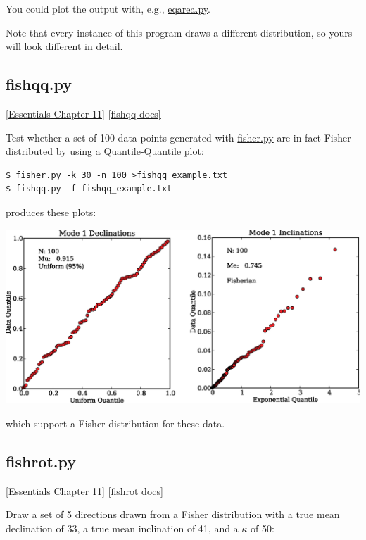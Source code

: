 \documentclass[11pt]{book}
\begin{document}
{{  You could plot the output with, e.g., \href{#eqarea.py}{eqarea.py}.

  Note that every instance of this program draws a different distribution, so yours will look different in detail.


\subsection{fishqq.py}
\href{http://earthref.org/MAGIC/books/Tauxe/Essentials/WebBook3ch11.html#ch11}{ [Essentials Chapter 11]}
\href{https://github.com/PmagPy/PmagPy/blob/master/programs/fishqq.py}{[fishqq docs]}

Test whether a set of 100 data points generated with \href{#fisher.py}{fisher.py} are in fact Fisher distributed by using a Quantile-Quantile plot:

\begin{verbatim}
$ fisher.py -k 30 -n 100 >fishqq_example.txt
$ fishqq.py -f fishqq_example.txt
\end{verbatim}

\noindent produces these plots:



\includegraphics[width=15cm]{EPSfiles/fishqq-ex.eps}

\noindent which support a Fisher distribution for these data.



\subsection{fishrot.py}
\href{http://earthref.org/MAGIC/books/Tauxe/Essentials/WebBook3ch11.html#ch11}{ [Essentials Chapter 11]}
\href{https://github.com/PmagPy/PmagPy/blob/master/programs/fishrot.py}{[fishrot docs]}

Draw a set of 5 directions drawn  from a Fisher distribution with a true mean declination of 33, a true mean inclination of 41, and a $\kappa$ of  50:

}}
\end{document}
